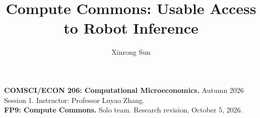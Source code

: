\documentclass[sigconf,nonacm,a4paper,10pt]{acmart}
\title{Compute Commons: Usable Access to Robot Inference}
\author{Xinrong Sun}
\affiliation{\institution{Duke Kunshan University}\city{Kunshan}\country{China}}
\begin{document}
\begin{teaserfigure}
\centering
\caption{Robot state determines usable service. Exact allocation compares value and access within this physical boundary; prediction before feedback separates payment comprehension from timeliness comprehension. All numerical evidence is synthetic.}
\end{teaserfigure}
\maketitle\raggedbottom
\noindent\textbf{COMSCI/ECON 206: Computational Microeconomics.} Autumn 2026 Session 1. Instructor: Professor Luyao Zhang.\\
\textbf{FP9: Compute Commons.} Solo team. Research revision, October 5, 2026.

\clearpage

\end{document}
